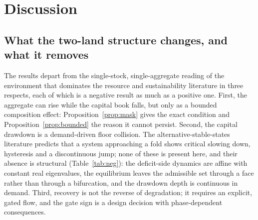 \section{Discussion}\label{sec:discussion}

\subsection{What the two-land structure changes, and what it removes}

The results depart from the single-stock, single-aggregate reading of the environment that dominates the resource and sustainability literature \citep{Schaefer1954,May1973,Meadows1972,Meadows2004,WackernagelRees1996,BranderTaylor1998} in three respects, each of which is a negative result as much as a positive one. First, the aggregate can rise while the capital book falls, but only as a bounded composition effect: Proposition~\ref{prop:mask} gives the exact condition and Proposition~\ref{prop:bounded} the reason it cannot persist. Second, the capital drawdown is a demand-driven floor collision. The alternative-stable-states literature \citep{Scheffer2001} predicts that a system approaching a fold shows critical slowing down, hysteresis and a discontinuous jump; none of these is present here, and their absence is structural (Table~\ref{tab:neg}): the deficit-side dynamics are affine with constant real eigenvalues, the equilibrium leaves the admissible set through a face rather than through a bifurcation, and the drawdown depth is continuous in demand. Third, recovery is not the reverse of degradation; it requires an explicit, gated flow, and the gate sign is a design decision with phase-dependent consequences.

